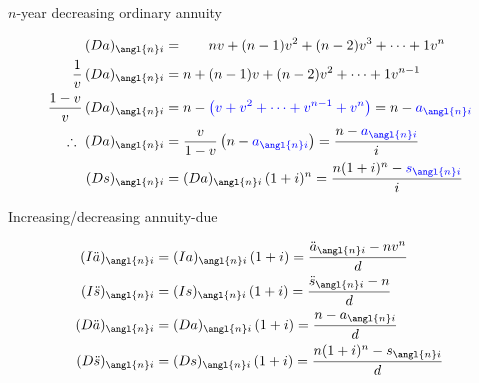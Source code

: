 \documentclass{beamer}
\begin{document}
\begin{frame}{$n$-year decreasing ordinary annuity}

\begin{center}
\end{center}

\vspace{-1ex}
\small
\begin{align*}
(Da)_{\angl{n}i} &= \phantom{n + {}} nv + (n-1)v^2 + (n-2)v^3 + \cdots + 1v^n \\
\frac{1}{v}\,(Da)_{\angl{n}i} &= n + (n-1)v + (n-2)v^2 + \cdots + 1v^{n-1} \\
\frac{1-v}{v}\,(Da)_{\angl{n}i} &= n - \blue{\left(v + v^2 + \cdots + v^{n-1} + v^n\right)} = n - \blue{a_{\angl{n}i}} \\
\therefore\ (Da)_{\angl{n}i} &= \frac{v}{1-v}\left(n - \blue{a_{\angl{n}i}}\right) = \frac{n - \blue{a_{\angl{n}i}}}{i} \\
(Ds)_{\angl{n}i} &= (Da)_{\angl{n}i}\,(1+i)^n = \frac{n(1+i)^n - \blue{s_{\angl{n}i}}}{i}
\end{align*}

\end{frame}

\begin{frame}{Increasing/decreasing annuity-due}

\begin{center}
\end{center}

\begin{align*}
(I\ddot{a})_{\angl{n}i} &= (Ia)_{\angl{n}i}\,(1+i) = \frac{\ddot{a}_{\angl{n}i} - nv^n}{d} \\
(I\ddot{s})_{\angl{n}i} &= (Is)_{\angl{n}i}\,(1+i) = \frac{\ddot{s}_{\angl{n}i} - n}{d} \\
(D\ddot{a})_{\angl{n}i} &= (Da)_{\angl{n}i}\,(1+i) = \frac{n - a_{\angl{n}i}}{d} \\
(D\ddot{s})_{\angl{n}i} &= (Ds)_{\angl{n}i}\,(1+i) = \frac{n(1+i)^n - s_{\angl{n}i}}{d}
\end{align*}

\end{frame}
\end{document}
